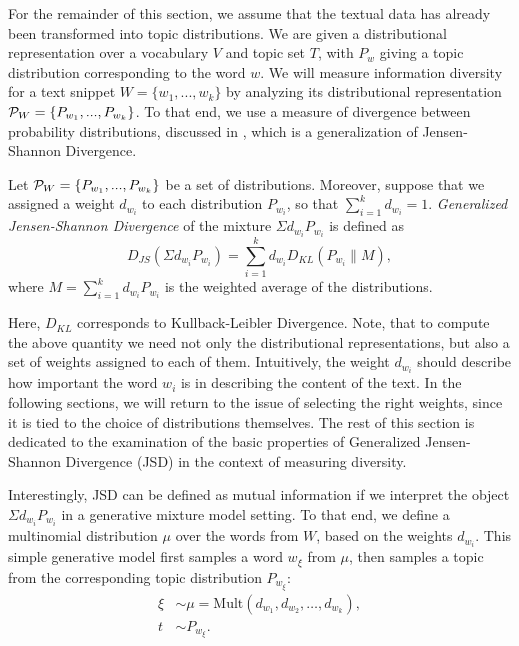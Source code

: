 For the remainder of this section, we assume that the
textual data has already been transformed into topic distributions.
We are given a distributional representation over a vocabulary $V$ and
topic set $T$, with $P_w$ giving a topic distribution corresponding to the
word $w$. We will measure information diversity
for a text snippet $W=\{w_1,...,w_k\}$ by analyzing its 
distributional representation ${\mathcal P}_{W}=\{P_{w_1},...,P_{w_k}\}$. To
that end, we use a measure of divergence between probability
distributions, discussed in \cite{FugledeTopsoe}, which is a
generalization of Jensen-Shannon Divergence.

\bed\label{diversity}
Let ${\mathcal P}_{W}=\{P_{w_1},...,P_{w_k}\}$ be a set of
distributions. Moreover, suppose that we assigned a weight $d_{w_i}$ to
each distribution $P_{w_i}$, so that $\sum_{i=1}^kd_{w_i}=1$.
{\em Generalized Jensen-Shannon Divergence} of the mixture
$\Sigma d_{w_i}P_{w_i}$ is defined as
$$D_{JS}(\Sigma d_{w_i}P_{w_i})=\sum_{i=1}^k
d_{w_i}D_{KL}(P_{w_i}\|M),$$
where $M=\sum_{i=1}^kd_{w_i} P_{w_i}$ is the weighted average of the
distributions. 
\eed

Here, $D_{KL}$ corresponds to Kullback-Leibler Divergence.
Note, that to compute the above quantity we need not only the
distributional representations, but also a set of weights assigned to
each of them. Intuitively, the weight $d_{w_i}$ should describe how
important the word $w_i$ is in describing the content of the text. In
the following sections, we will return to the issue of selecting the
right weights, since it is tied to the choice of distributions
themselves. The rest of this section is dedicated to the examination of the
basic properties of Generalized Jensen-Shannon Divergence (JSD) in the
context of measuring diversity. 

Interestingly, JSD can be defined as mutual information if we
interpret the object $\Sigma d_{w_i}P_{w_i}$ in a generative mixture
model setting. To that end, we define a multinomial distribution
$\mu$ over the words from $W$, based on the weights $d_{w_i}$. This
simple generative model first samples a word $w_\xi$ from $\mu$, then samples a
topic from the corresponding topic distribution $P_{w_\xi}$:
\begin{align*}
\xi &\sim \mu=\textrm{Mult}(d_{w_1},d_{w_2},\dots,d_{w_k}),\\
t &\sim P_{w_\xi}.
\end{align*}

